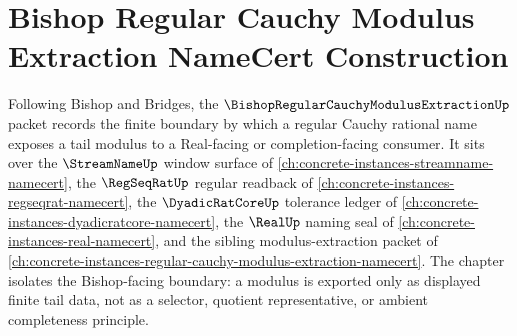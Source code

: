 \chapter{Bishop Regular Cauchy Modulus Extraction NameCert Construction}
\label{ch:concrete-instances-bishop-regular-cauchy-modulus-extraction-namecert}

Following Bishop and Bridges, the $\BishopRegularCauchyModulusExtractionUp$ packet records the finite boundary by which a regular Cauchy rational name exposes a tail modulus to a Real-facing or completion-facing consumer. It sits over the $\StreamNameUp$ window surface of \autoref{ch:concrete-instances-streamname-namecert}, the $\RegSeqRatUp$ regular readback of \autoref{ch:concrete-instances-regseqrat-namecert}, the $\DyadicRatCoreUp$ tolerance ledger of \autoref{ch:concrete-instances-dyadicratcore-namecert}, the $\RealUp$ naming seal of \autoref{ch:concrete-instances-real-namecert}, and the sibling modulus-extraction packet of \autoref{ch:concrete-instances-regular-cauchy-modulus-extraction-namecert}. The chapter isolates the Bishop-facing boundary: a modulus is exported only as displayed finite tail data, not as a selector, quotient representative, or ambient completeness principle.

